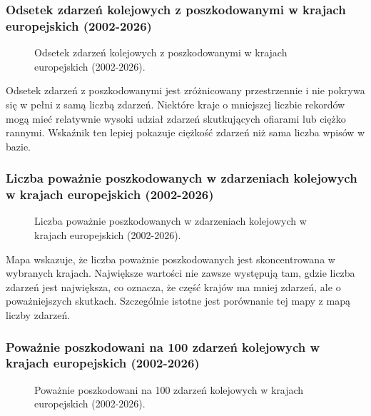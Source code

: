 \documentclass[12pt]{article}
\begin{document}
\subsubsection{Odsetek zdarzeń kolejowych z poszkodowanymi w krajach europejskich (2002-2026)}
\begin{figure}[H]
    \centering
    
    \caption{Odsetek zdarzeń kolejowych z poszkodowanymi w krajach europejskich (2002-2026).}
\end{figure}

Odsetek zdarzeń z poszkodowanymi jest zróżnicowany przestrzennie i nie pokrywa się w pełni z samą liczbą zdarzeń. Niektóre kraje o mniejszej liczbie rekordów mogą mieć relatywnie wysoki udział zdarzeń skutkujących ofiarami lub ciężko rannymi. Wskaźnik ten lepiej pokazuje ciężkość zdarzeń niż sama liczba wpisów w bazie.


\subsubsection{Liczba poważnie poszkodowanych w zdarzeniach kolejowych w krajach europejskich (2002-2026)}
\begin{figure}[H]
    \centering
    
    \caption{Liczba poważnie poszkodowanych w zdarzeniach kolejowych w krajach europejskich (2002-2026).}
\end{figure}

Mapa wskazuje, że liczba poważnie poszkodowanych jest skoncentrowana w wybranych krajach. Największe wartości nie zawsze występują tam, gdzie liczba zdarzeń jest największa, co oznacza, że część krajów ma mniej zdarzeń, ale o poważniejszych skutkach. Szczególnie istotne jest porównanie tej mapy z mapą liczby zdarzeń.



\subsubsection{Poważnie poszkodowani na 100 zdarzeń kolejowych w krajach europejskich (2002-2026)}
\begin{figure}[H]
    \centering
    
    \caption{Poważnie poszkodowani na 100 zdarzeń kolejowych w krajach europejskich (2002-2026).}
\end{figure}
\end{document}
